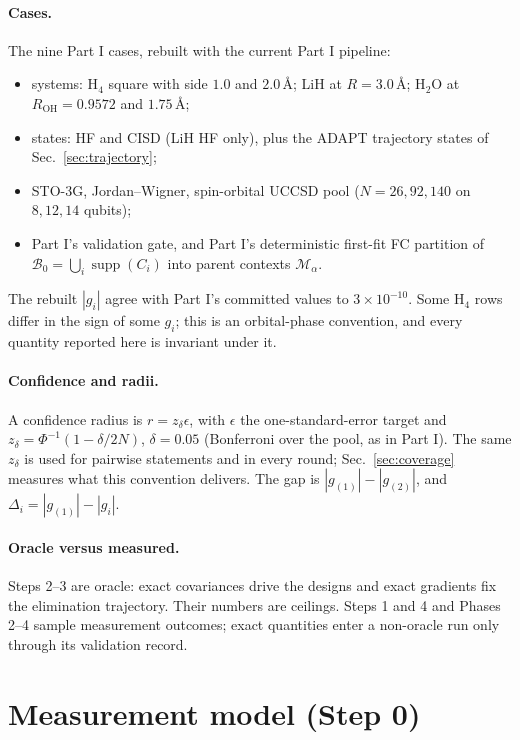 \documentclass[10.5pt]{article}
\newcommand{\supp}{\operatorname{supp}}
\begin{document}
\paragraph{Cases.}
The nine Part I cases, rebuilt with the current Part I pipeline:
\begin{itemize}
  \item systems: H$_4$ square with side $1.0$ and $2.0$\,\AA; LiH at $R=3.0$\,\AA; H$_2$O at $R_{\mathrm{OH}}=0.9572$ and $1.75$\,\AA;
  \item states: HF and CISD (LiH HF only), plus the ADAPT trajectory states of Sec.~\ref{sec:trajectory};
  \item STO-3G, Jordan--Wigner, spin-orbital UCCSD pool ($N=26,92,140$ on $8,12,14$ qubits);
  \item Part I's validation gate, and Part I's deterministic first-fit FC partition of $\mathcal B_0=\bigcup_i\supp(C_i)$ into parent contexts $\mathcal M_\alpha$.
\end{itemize}
The rebuilt $|g_i|$ agree with Part I's committed values to $3\times10^{-10}$. Some H$_4$ rows differ in the sign of some $g_i$; this is an orbital-phase convention, and every quantity reported here is invariant under it.

\paragraph{Confidence and radii.}
A confidence radius is $r=z_\delta\epsilon$, with $\epsilon$ the one-standard-error target and $z_\delta=\Phi^{-1}(1-\delta/2N)$, $\delta=0.05$ (Bonferroni over the pool, as in Part I). The same $z_\delta$ is used for pairwise statements and in every round; Sec.~\ref{sec:coverage} measures what this convention delivers. The gap is $|g_{(1)}|-|g_{(2)}|$, and $\Delta_i=|g_{(1)}|-|g_i|$.

\paragraph{Oracle versus measured.}
Steps 2--3 are oracle: exact covariances drive the designs and exact gradients fix the elimination trajectory. Their numbers are ceilings. Steps 1 and 4 and Phases 2--4 sample measurement outcomes; exact quantities enter a non-oracle run only through its validation record.

\section{Measurement model (Step 0)}
\label{sec:measurement}
\end{document}

